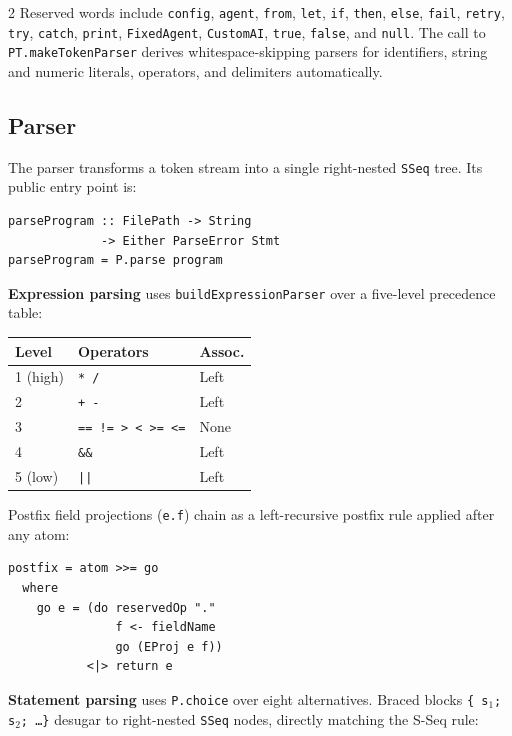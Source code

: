 \documentclass[10pt]{article}
\begin{document}
\begin{multicols}{2}
Reserved words include \texttt{config}, \texttt{agent}, \texttt{from},
\texttt{let}, \texttt{if}, \texttt{then}, \texttt{else}, \texttt{fail},
\texttt{retry}, \texttt{try}, \texttt{catch}, \texttt{print},
\texttt{FixedAgent}, \texttt{CustomAI}, \texttt{true}, \texttt{false},
and \texttt{null}.  The call to \texttt{PT.makeTokenParser} derives
whitespace-skipping parsers for identifiers, string and numeric literals,
operators, and delimiters automatically.

\subsection{Parser}

The parser transforms a token stream into a single right-nested \texttt{SSeq}
tree.  Its public entry point is:

\begin{lstlisting}[style=hs]
parseProgram :: FilePath -> String
             -> Either ParseError Stmt
parseProgram = P.parse program
\end{lstlisting}

\noindent\textbf{Expression parsing} uses \texttt{buildExpressionParser} over
a five-level precedence table:

\begin{center}
\small
\begin{tabular}{lll}
\toprule
Level & Operators & Assoc. \\
\midrule
1 (high) & \texttt{* /}           & Left \\
2        & \texttt{+ -}           & Left \\
3        & \texttt{== != > < >= <=} & None \\
4        & \texttt{\&\&}          & Left \\
5 (low)  & \texttt{||}            & Left \\
\bottomrule
\end{tabular}
\end{center}

Postfix field projections (\texttt{e.f}) chain as a left-recursive postfix
rule applied after any atom:

\begin{lstlisting}[style=hs]
postfix = atom >>= go
  where
    go e = (do reservedOp "."
               f <- fieldName
               go (EProj e f))
           <|> return e
\end{lstlisting}

\noindent\textbf{Statement parsing} uses \texttt{P.choice} over eight
alternatives.  Braced blocks \texttt{\{ s$_1$; s$_2$; \ldots \}} desugar to
right-nested \texttt{SSeq} nodes, directly matching the S-Seq rule:


\end{multicols}
\end{document}

